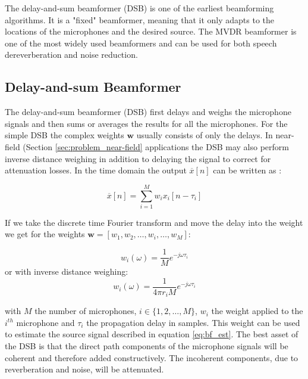 The delay-and-sum beamformer (DSB) is one of the earliest beamforming algorithms. It is a "fixed" beamformer, meaning that it only adapts to the locations of the microphones and the desired source. The MVDR beamformer is one of the most widely used beamformers and can be used for both speech dereverberation and noise reduction.


\subsection{Delay-and-sum Beamformer}
\label{sec:des_dsb}
The delay-and-sum beamformer (DSB) first delays and weighs the microphone signals and then sums or averages the results for all the microphones. For the simple DSB the complex weights $\textbf{w}$ usually consists of only the delays. In near-field (Section \ref{sec:problem_near-field} applications the DSB may also perform inverse distance weighing in addition to delaying the signal to correct for attenuation losses. In the time domain the output $\overline{x}[n]$ can be written as \cite{naylor2010speech}:

\begin{equation}
\overline{x}[n] = \sum_{i=1}^{M} w_{i}x_{i}[n-\tau_{i}]
\end{equation}


If we take the discrete time Fourier transform and move the delay into the weight we get for the weights $\textbf{w} = [w_1,w_2,\dots,w_i,\dots,w_M]$: 

\begin{equation}
w_i(\omega) = \frac{1}{M} e^{-j\omega\tau_i}
\end{equation}
or with inverse distance weighing:
\begin{equation}
w_i(\omega) = \frac{1}{4\pi r_{i} M} e^{-j\omega\tau_i}
\end{equation}

with $M$ the number of microphones, $i \in \{1,2,\dots,M\}$, $w_{i}$ the weight applied to the $i^{th}$ microphone and $\tau_{i}$ the propagation delay in samples. This weight can be used to estimate the source signal described in equation \ref{eq:bf_est}. \newline
The best asset of the DSB is that the direct path components of the microphone signals will be coherent and therefore added constructively. The incoherent components, due to reverberation and noise, will be attenuated.


